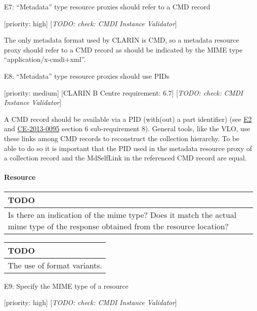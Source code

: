 \documentclass[]{article}
\let\oldparagraph\paragraph
\renewcommand{\paragraph}[1]{\oldparagraph{#1}\mbox{}}
\begin{document}
E7: ``Metadata'' type resource proxies should refer to a CMD record

{[}priority: high{]} {[}\emph{TODO: check: CMDI Instance Validator}{]}

The only metadata format used by CLARIN is CMD, so a metadata resource
proxy should refer to a CMD record as should be indicated by the MIME
type ``application/x-cmdi+xml''.

E8: ``Metadata'' type resource proxies should use PIDs

{[}priority: medium{]} {[}CLARIN B Centre requirement: 6.7{]}
{[}\emph{TODO: check: CMDI Instance Validator}{]}

A CMD record should be available via a PID (with(out) a part identifier)
(see
\protect\hyperlink{e2-the-mdselflink-should-be-a-persistent-identifier-pid}{E2}
and \href{http://hdl.handle.net/1839/00-DOCS.CLARIN.EU-78}{CE-2013-0095}
section 6 sub-requirement 8). General tools, like the VLO, use these
links among CMD records to reconstruct the collection hierarchy. To be
able to do so it is important that the PID used in the metadata resource
proxy of a collection record and the MdSelfLink in the referenced CMD
record are equal.

\paragraph{Resource}\label{resource}

\begin{longtable}[c]{@{}l@{}}
\toprule
\begin{minipage}[b]{0.05\columnwidth}\raggedright\strut
TODO
\strut\end{minipage}\tabularnewline
\midrule
\endhead
\begin{minipage}[t]{0.05\columnwidth}\raggedright\strut
Is there an indication of the mime type? Does it match the actual mime
type of the response obtained from the resource location?
\strut\end{minipage}\tabularnewline
\bottomrule
\end{longtable}

\begin{longtable}[c]{@{}l@{}}
\toprule
TODO\tabularnewline
\midrule
\endhead
The use of format variants.\tabularnewline
\bottomrule
\end{longtable}

E9: Specify the MIME type of a resource

{[}priority: high{]} {[}\emph{TODO: check: CMDI Instance Validator}{]}
\end{document}
